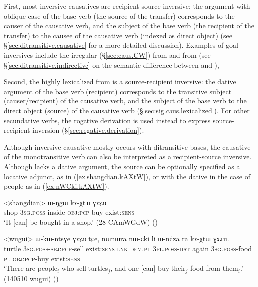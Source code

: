 First, most inversive causatives are recipient-source inversive: the argument with oblique case of the base verb (the source of the transfer) corresponds to the causer of the causative verb, and the subject of the base verb (the recipient of the transfer) to the causee of the causative verb  (indexed as direct object) (see §\ref{sec:ditransitive.causative} for a more detailed discussion). Examples of goal inversives include the irregular  (§\ref{sec:caus.CW}) from  and  from  (see §\ref{sec:ditransitive.indirective} on the semantic difference between  and ), 

Second, the highly lexicalized  from  is a source-recipient inversive: the dative argument of the base verb (recipient) corresponds to the transitive subject (causer/recipient) of the causative verb, and the subject of the base verb to the direct object (source) of the causative verb (§\ref{sec:sig.caus.lexicalized}). For other secundative verbs, the rogative  derivation is used instead to express source-recipient inversion (§\ref{sec:rogative.derivation}).

Although inversive causative mostly occurs with ditransitive bases, the causative of the monotransitive verb  can also be interpreted as a recipient-source inversive. Although  lacks a dative argument, the source can be optionally specified as a locative adjunct, as in (\ref{ex:shangdian.kAXtW}), or with the dative in the case of people as in (\ref{ex:nWCki.kAXtW}).

\begin{exe}
\ex \label{ex:shangdian.kAXtW}
\gll <shangdian> ɯ-ŋgɯ kɤ-χtɯ ɣɤʑu \\
shop \textsc{3sg}.\textsc{poss}-inside \textsc{obj}:\textsc{pcp}-buy exist:\textsc{sens} \\
\glt `It [can] be bought in a shop.' (28-CAmWGdW)
()
\end{exe}
 
 \begin{exe}
\ex \label{ex:nWCki.kAXtW}
\gll  <wugui> ɯ-kɯ-ntsɣe ɣɤʑu tɕe, nɯnɯra nɯ-ɕki li ɯ-ndza ra kɤ-χtɯ ɣɤʑu. \\
turtle \textsc{3sg}.\textsc{poss}-\textsc{sbj}:\textsc{pcp}-sell exist:\textsc{sens} \textsc{lnk} \textsc{dem}.\textsc{pl} \textsc{3pl}.\textsc{poss}-\textsc{dat} again \textsc{3sg}.\textsc{poss}-food \textsc{pl} \textsc{obj}:\textsc{pcp}-buy exist:\textsc{sens} \\
\glt `There are people$_i$ who sell turtles$_j$, and one [can] buy their$_j$ food from them$_i$.' (140510 wugui)
()
\end{exe}

